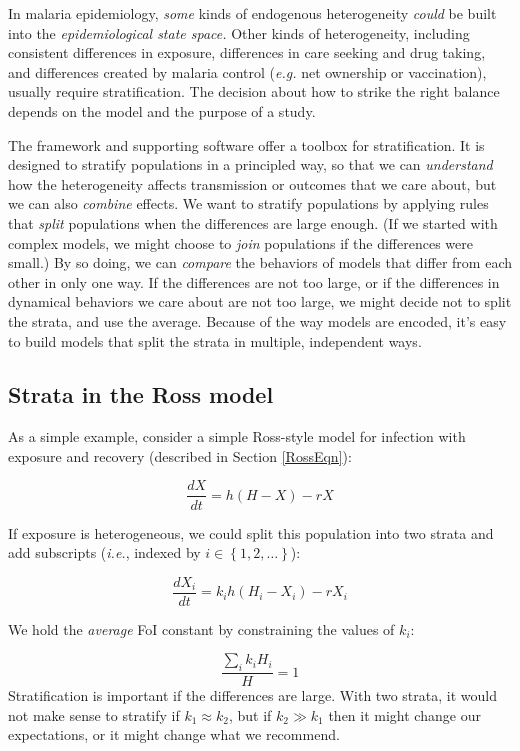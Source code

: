 \documentclass[
]{book}
\begin{document}
In malaria epidemiology, \emph{some} kinds of endogenous heterogeneity \emph{could} be built into the \emph{epidemiological state space.} Other kinds of heterogeneity, including consistent differences in exposure, differences in care seeking and drug taking, and differences created by malaria control (\emph{e.g.} net ownership or vaccination), usually require stratification. The decision about how to strike the right balance depends on the model and the purpose of a study.

The framework and supporting software offer a toolbox for stratification. It is designed to stratify populations in a principled way, so that we can \emph{understand} how the heterogeneity affects transmission or outcomes that we care about, but we can also \emph{combine} effects. We want to stratify populations by applying rules that \emph{split} populations when the differences are large enough. (If we started with complex models, we might choose to \emph{join} populations if the differences were small.) By so doing, we can \emph{compare} the behaviors of models that differ from each other in only one way. If the differences are not too large, or if the differences in dynamical behaviors we care about are not too large, we might decide not to split the strata, and use the average. Because of the way models are encoded, it's easy to build models that split the strata in multiple, independent ways.

\subsection{Strata in the Ross model}\label{strata-in-the-ross-model}

As a simple example, consider a simple Ross-style model for infection with exposure and recovery (described in Section \ref{RossEqn}):

\[\frac{dX}{dt} = h (H-X)-r X\]

If exposure is heterogeneous, we could split this population into two strata and add subscripts (\emph{i.e.}, indexed by \(i \in \left\{1,2, \ldots \right\}\)):

\[\frac{dX_i}{dt} =  k_i h (H_i -X_i)-r X_i\]

We hold the \emph{average} FoI constant by constraining the values of \(k_i\):

\[\frac{\sum_i k_i H_i}{H} = 1\]
Stratification is important if the differences are large. With two strata, it would not make sense to stratify if \(k_1 \approx k_2\), but if \(k_2 \gg k_1\) then it might change our expectations, or it might change what we recommend.
\end{document}
